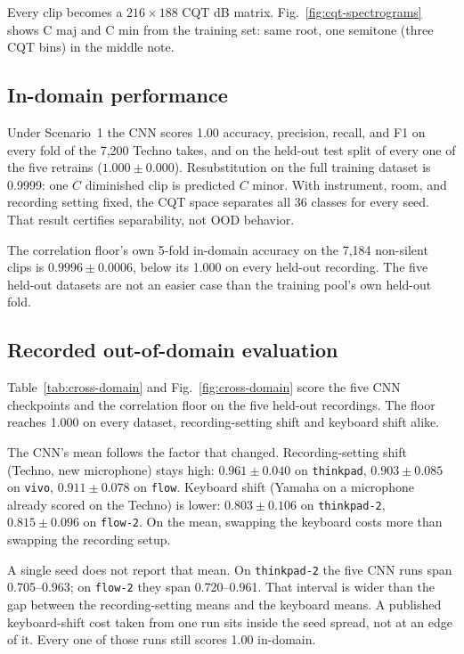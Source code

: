 \documentclass[pdflatex,sn-mathphys-num,iicol]{sn-jnl}
\theoremstyle{thmstyleone}
\theoremstyle{thmstyletwo}
\theoremstyle{thmstylethree}
\begin{document}
Every clip becomes a $216 \times 188$ CQT dB matrix. Fig.~\ref{fig:cqt-spectrograms} shows C maj and C min from the training set: same root, one semitone (three CQT bins) in the middle note.

\subsection{In-domain performance}\label{subsec4_2}

Under Scenario~1 the CNN scores 1.00 accuracy, precision, recall, and F1 on every fold of the 7{,}200 Techno takes, and on the held-out test split of every one of the five retrains ($1.000\pm0.000$). Resubstitution on the full training dataset is 0.9999: one $C$ diminished clip is predicted $C$ minor. With instrument, room, and recording setting fixed, the CQT space separates all 36 classes for every seed. That result certifies separability, not OOD behavior.

The correlation floor's own 5-fold in-domain accuracy on the 7{,}184 non-silent clips is $0.9996\pm0.0006$, below its 1.000 on every held-out recording. The five held-out datasets are not an easier case than the training pool's own held-out fold.

\subsection{Recorded out-of-domain evaluation}\label{subsec4_3}

Table~\ref{tab:cross-domain} and Fig.~\ref{fig:cross-domain} score the five CNN checkpoints and the correlation floor on the five held-out recordings. The floor reaches 1.000 on every dataset, recording-setting shift and keyboard shift alike.

The CNN's mean follows the factor that changed. Recording-setting shift (Techno, new microphone) stays high: $0.961\pm0.040$ on \texttt{thinkpad}, $0.903\pm0.085$ on \texttt{vivo}, $0.911\pm0.078$ on \texttt{flow}. Keyboard shift (Yamaha on a microphone already scored on the Techno) is lower: $0.803\pm0.106$ on \texttt{thinkpad-2}, $0.815\pm0.096$ on \texttt{flow-2}. On the mean, swapping the keyboard costs more than swapping the recording setup.

A single seed does not report that mean. On \texttt{thinkpad-2} the five CNN runs span 0.705--0.963; on \texttt{flow-2} they span 0.720--0.961. That interval is wider than the gap between the recording-setting means and the keyboard means. A published keyboard-shift cost taken from one run sits inside the seed spread, not at an edge of it. Every one of those runs still scores 1.00 in-domain.
\end{document}
